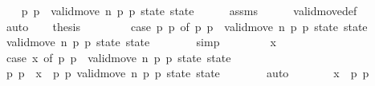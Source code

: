 \begin{isabellebody}
\isanewline
\ \ \isamarkupfalse%
\ p{}\ p{}\ \ {\isachardoublequoteopen}valid{\isacharunderscore}move{\isacharprime}\ n\ p{}\ p{}\ state\ state{\isacharprime}{\isachardoublequoteclose}\isanewline
\ \ \ \ \isamarkupfalse%
\ assms\isanewline
\ \ \ \ \isamarkupfalse%
\ valid{\isacharunderscore}move{\isacharunderscore}def\isanewline
\ \ \ \ \isamarkupfalse%
\ auto\isanewline
\ \ \isamarkupfalse%
\ {\isacharquery}thesis\isanewline
\ \ \isamarkupfalse%
\isanewline
\ \ \ \ \isamarkupfalse%
\ {\isachardoublequoteopen}case\ {\isacharparenleft}p{}{\isacharcomma}\ p{}{\isacharparenright}\ of\ {\isacharparenleft}p{}{\isacharcomma}\ p{}{\isacharparenright}\ {\isasymRightarrow}\ valid{\isacharunderscore}move{\isacharprime}\ n\ p{}\ p{}\ state\ state{\isacharprime}{\isachardoublequoteclose}\isanewline
\ \ \ \ \ \ \isamarkupfalse%
\ {\isacharbackquoteopen}valid{\isacharunderscore}move{\isacharprime}\ n\ p{}\ p{}\ state\ state{\isacharprime}{\isacharbackquoteclose}\isanewline
\ \ \ \ \ \ \isamarkupfalse%
\ simp\isanewline
\ \ \isamarkupfalse%
\isanewline
\ \ \ \ \isamarkupfalse%
\ x\isanewline
\ \ \ \ \isamarkupfalse%
\ {\isachardoublequoteopen}case\ x\ of\ {\isacharparenleft}p{}{\isacharprime}{\isacharcomma}\ p{}{\isacharprime}{\isacharparenright}\ {\isasymRightarrow}\ valid{\isacharunderscore}move{\isacharprime}\ n\ p{}{\isacharprime}\ p{}{\isacharprime}\ state\ state{\isacharprime}{\isachardoublequoteclose}\isanewline
\ \ \ \ \isamarkupfalse%
\ \isamarkupfalse%
\ p{}{\isacharprime}\ p{}{\isacharprime}\ \ {\isachardoublequoteopen}x\ {\isacharequal}\ {\isacharparenleft}p{}{\isacharprime}{\isacharcomma}\ p{}{\isacharprime}{\isacharparenright}{\isachardoublequoteclose}\ {\isachardoublequoteopen}valid{\isacharunderscore}move{\isacharprime}\ n\ p{}{\isacharprime}\ p{}{\isacharprime}\ state\ state{\isacharprime}{\isachardoublequoteclose}\isanewline
\ \ \ \ \ \ \isamarkupfalse%
\ auto\isanewline
\ \ \ \ \isamarkupfalse%
\ \isamarkupfalse%
\ {\isachardoublequoteopen}x\ {\isacharequal}\ {\isacharparenleft}p{}{\isacharcomma}\ p{}{\isacharparenright}{\isachardoublequoteclose}\isanewline

\end{isabellebody}
